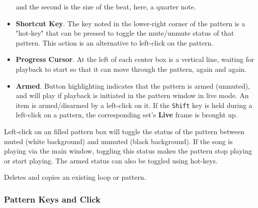\begin{itemize}
         and the second is the size of the beat, here, a quarter note.
      \item \textbf{Shortcut Key}.
         The key noted in the lower-right corner of the pattern is a "hot-key"
         that can be pressed to toggle the mute/unmute status of that pattern.
         This action is an alternative to left-click on the pattern.
      \item \textbf{Progress Cursor}.
         At the left of each center box is a vertical line, waiting for
         playback to start so that it can move through the pattern, again and
         again.
      \item \textbf{Armed}.
         Button highlighting indicates that the pattern is armed
         (unmuted), and will play if playback is initiated in the pattern
         window in live mode.
         An item is armed/disarmed by a left-click on it.
         If the \texttt{Shift} key is held during a left-click on a pattern,
         the corresponding set's \textbf{Live} frame is brought up.
   \end{itemize}

   Left-click on an filled pattern box will toggle the status of the
   pattern between muted (white background) and unmuted (black background).
   If the song is playing via the main window, toggling this status makes
   the pattern stop playing or start playing.  The armed status
   can also be toggled using hot-keys.

   Deletes and copies an existing loop or pattern.



\subsubsection{Pattern Keys and Click}
\label{subsubsec:patterns_pattern_keys_and_clicks}

